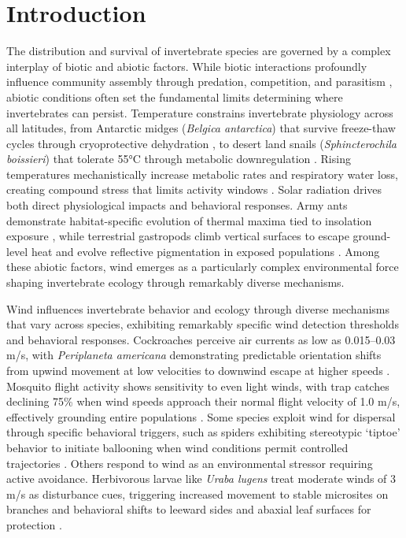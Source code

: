 \usepackage{hyperref}
\usepackage{longtable}

\chapter{Introduction}
\label{ch:introduction}

The distribution and survival of invertebrate species are governed by a complex interplay of biotic and abiotic factors. While biotic interactions profoundly influence community assembly through predation, competition, and parasitism \citep{blois-heulinDirectIndirectEffects1990,laffertyComparingMechanismsHost2013,miller-terkuilePredatorPreyInteractions2022}, abiotic conditions often set the fundamental limits determining where invertebrates can persist. Temperature constrains invertebrate physiology across all latitudes, from Antarctic midges (\textit{Belgica antarctica}) that survive freeze-thaw cycles through cryoprotective dehydration \citep{everattResponsesInvertebratesTemperature2015}, to desert land snails (\textit{Sphincterochila boissieri}) that tolerate 55°C through metabolic downregulation \citep{schweizerSnailsSunStrategies2019}. Rising temperatures mechanistically increase metabolic rates and respiratory water loss, creating compound stress that limits activity windows \citep{chownWaterLossInsects2011}. Solar radiation drives both direct physiological impacts and behavioral responses. Army ants demonstrate habitat-specific evolution of thermal maxima tied to insolation exposure \citep{baudierExtremeInsolationClimatic2018}, while terrestrial gastropods climb vertical surfaces to escape ground-level heat and evolve reflective pigmentation in exposed populations \citep{schweizerSnailsSunStrategies2019}. Among these abiotic factors, wind emerges as a particularly complex environmental force shaping invertebrate ecology through remarkably diverse mechanisms.

Wind influences invertebrate behavior and ecology through diverse mechanisms that vary across species, exhibiting remarkably specific wind detection thresholds and behavioral responses. Cockroaches perceive air currents as low as 0.015--0.03 m/s, with \textit{Periplaneta americana} demonstrating predictable orientation shifts from upwind movement at low velocities to downwind escape at higher speeds \citep{bellSearchAnemotacticOrientation1979}. Mosquito flight activity shows sensitivity to even light winds, with trap catches declining 75\% when wind speeds approach their normal flight velocity of 1.0 m/s, effectively grounding entire populations \citep{bidlingmayerEffectWindVelocity1974}. Some species exploit wind for dispersal through specific behavioral triggers, such as spiders exhibiting stereotypic `tiptoe' behavior to initiate ballooning when wind conditions permit controlled trajectories \citep{bonteHeritabilitySpiderBallooning2007}. Others respond to wind as an environmental stressor requiring active avoidance. Herbivorous larvae like \textit{Uraba lugens} treat moderate winds of 3 m/s as disturbance cues, triggering increased movement to stable microsites on branches and behavioral shifts to leeward sides and abaxial leaf surfaces for protection \citep{leonardExposureWindAlters2016}.

